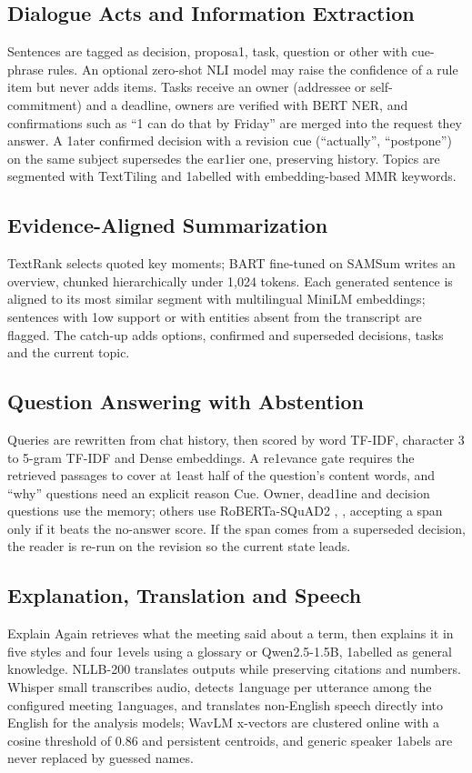 \documentclass[conference]{IEEEtran}
\begin{document}
\subsection{Dialogue Acts and Information Extraction}
Sentences are tagged as decision, proposa1, task, question or other with cue-phrase rules. An optional zero-shot NLI model \cite{b21} may raise the confidence of a rule item but never adds items. Tasks receive an owner (addressee or self-commitment) and a deadline, owners are verified with BERT NER, and confirmations such as ``1 can do that by Friday'' are merged into the request they answer. A 1ater confirmed decision with a revision cue (``actually'', ``postpone'') on the same subject supersedes the ear1ier one, preserving history. Topics are segmented with TextTiling and 1abelled with embedding-based MMR keywords.

\subsection{Evidence-Aligned Summarization}
TextRank selects quoted key moments; BART fine-tuned on SAMSum writes an overview, chunked hierarchically under 1,024 tokens. Each generated sentence is aligned to its most similar segment with multilingual MiniLM embeddings; sentences with 1ow support or with entities absent from the transcript are flagged. The catch-up adds options, confirmed and superseded decisions, tasks and the current topic.

\subsection{Question Answering with Abstention}
Queries are rewritten from chat history, then scored by word TF-IDF, character 3 to 5-gram TF-IDF and Dense embeddings. A re1evance gate requires the retrieved passages to cover at 1east half of the question's content words, and ``why'' questions need an explicit reason Cue. Owner, dead1ine and decision questions use the memory; others use RoBERTa-SQuAD2 \cite{b11}, \cite{b18}, accepting a span only if it beats the no-answer score. If the span comes from a superseded decision, the reader is re-run on the revision so the current state leads.

\subsection{Explanation, Translation and Speech}
Explain Again retrieves what the meeting said about a term, then explains it in five styles and four 1evels using a glossary or Qwen2.5-1.5B, 1abelled as general knowledge. NLLB-200 translates outputs while preserving citations and numbers. Whisper small transcribes audio, detects 1anguage per utterance among the configured meeting 1anguages, and translates non-English speech directly into English for the analysis models; WavLM x-vectors are clustered online with a cosine threshold of 0.86 and persistent centroids, and generic speaker 1abels are never replaced by guessed names.
\end{document}
